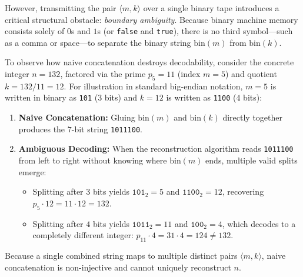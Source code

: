 \documentclass[acmsmall,natbib=false,nonacm]{acmart}
\begin{document}
However, transmitting the pair $\langle m, k\rangle$ over a single binary tape introduces a critical structural obstacle: \textit{boundary ambiguity}. Because binary machine memory consists solely of $0$s and $1$s (or \texttt{false} and \texttt{true}), there is no third symbol—such as a comma or space—to separate the binary string $\text{bin}(m)$ from $\text{bin}(k)$.

To observe how naive concatenation destroys decodability, consider the concrete integer $n = 132$, factored via the prime $p_5 = 11$ (index $m = 5$) and quotient $k = 132 / 11 = 12$. For illustration in standard big-endian notation, $m = 5$ is written in binary as \texttt{101} ($3$ bits) and $k = 12$ is written as \texttt{1100} ($4$ bits):
\begin{enumerate}
    \item \textbf{Naive Concatenation:} Gluing $\text{bin}(m)$ and $\text{bin}(k)$ directly together produces the $7$-bit string \texttt{1011100}.
    \item \textbf{Ambiguous Decoding:} When the reconstruction algorithm reads \texttt{1011100} from left to right without knowing where $\text{bin}(m)$ ends, multiple valid splits emerge:
    \begin{itemize}
        \item Splitting after $3$ bits yields $\texttt{101}_2 = 5$ and $\texttt{1100}_2 = 12$, recovering $p_5 \cdot 12 = 11 \cdot 12 = 132$.
        \item Splitting after $4$ bits yields $\texttt{1011}_2 = 11$ and $\texttt{100}_2 = 4$, which decodes to a completely different integer: $p_{11} \cdot 4 = 31 \cdot 4 = 124 \neq 132$.
    \end{itemize}
\end{enumerate}
Because a single combined string maps to multiple distinct pairs $\langle m, k\rangle$, naive concatenation is non-injective and cannot uniquely reconstruct $n$.
\end{document}
